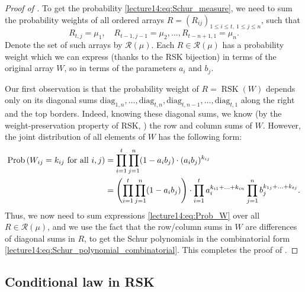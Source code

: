 \documentclass[letterpaper,11pt,oneside,reqno]{book}
\numberwithin{equation}{chapter}  %
\theoremstyle{definition}
\begin{document}
\begin{proof}[Proof of ]
	To get the probability
	\eqref{lecture14:eq:Schur_measure}, we need to sum the probability weights of all
	ordered arrays $R=(R_{ij})_{1\le i\le t,\ 1\le j\le n}$, such that
	\begin{equation*}
		R_{t,j}=\mu_1,\quad R_{t-1,j-1}=\mu_2,\ldots,
		R_{t-n+1,1}=\mu_n.
	\end{equation*}
	Denote the set of such arrays by $\mathcal{R}(\mu)$.
	Each $R\in \mathcal{R}(\mu)$ has a probability weight which we can express (thanks to the
	RSK bijection) in terms of the original array $W$,
	so in terms of the parameters $a_i$ and $b_j$.

	Our first observation is that the probability weight of $R=\operatorname{RSK}(W)$ depends only on its
	diagonal sums $\mathrm{diag}_{1,n},\ldots,\mathrm{diag}_{t,n},\mathrm{diag}_{t,n-1},\ldots,\mathrm{diag}_{t,1} $
	along the right and the top borders.
	Indeed, knowing these diagonal sums, we know (by the weight-preservation property of RSK, )
	the row and column sums of $W$. However, the joint distribution of all
	elements of $W$ has the following form:
	\begin{equation}
		\label{lecture14:eq:Prob_W}
		\begin{split}
			\operatorname{Prob}\left( W_{ij}=k_{ij}
			\ \textnormal{for all } i,j \right)
			&=
			\prod_{i=1}^t\prod_{j=1}^n
			(1-a_i b_j)\cdot (a_ib_j)^{k_{ij}} \\
			&=
			\Biggl(\prod_{i=1}^t\prod_{j=1}^n
			(1-a_i b_j)\Biggr)
			\cdot
			\prod_{i=1}^t a_i^{k_{i1}+\ldots+k_{in}}
			\prod_{j=1}^n b_j^{k_{1j}+\ldots+k_{tj}}.
		\end{split}
	\end{equation}
	Thus, we now need to sum expressions
	\eqref{lecture14:eq:Prob_W}
	over all $R\in \mathcal{R}(\mu)$,
	and we use the fact that the row/column sums in $W$
	are differences of diagonal sums in $R$, to get the Schur polynomials
	in the combinatorial form
	\eqref{lecture14:eq:Schur_polynomial_combinatorial}.
	This completes the proof of .
\end{proof}

\subsection{Conditional law in RSK}
\label{lecture14:sub:conditional_law_RSK}
\end{document}
